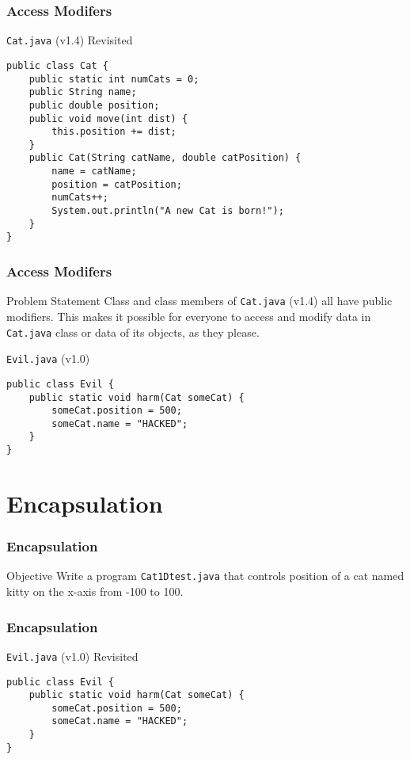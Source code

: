 \documentclass[10pt, compress]{beamer}
\begin{document}
\begin{frame}[fragile]
	\frametitle{Access Modifers}
	\begin{block}{\texttt{Cat.java} (v1.4) Revisited}
		\begin{verbatim}
public class Cat {
	public static int numCats = 0;
	public String name;
	public double position;
	public void move(int dist) {
		this.position += dist;
	}
	public Cat(String catName, double catPosition) {
		name = catName;
		position = catPosition;
		numCats++;
		System.out.println("A new Cat is born!");
	}
}
		\end{verbatim}
	\end{block}
\end{frame}

\begin{frame}[fragile]
	\frametitle{Access Modifers}
	\begin{block}{Problem Statement}
		Class and class members of \texttt{Cat.java} (v1.4) all have public modifiers.
		This makes it possible for everyone to access and modify data in \texttt{Cat.java} class or data of its objects, as they please.
	\end{block}
	\begin{block}{\texttt{Evil.java} (v1.0)}
		\begin{verbatim}
public class Evil {
	public static void harm(Cat someCat) {
		someCat.position = 500;
		someCat.name = "HACKED";
	}
}
		\end{verbatim}
	\end{block}
\end{frame}

\section{Encapsulation}

\begin{frame}[fragile]
	\frametitle{Encapsulation}
	\begin{block}{Objective}
		Write a program \texttt{Cat1Dtest.java} that controls position of a cat named kitty on the x-axis from -100 to 100.
	\end{block}
\end{frame}

\begin{frame}[fragile]
	\frametitle{Encapsulation}
	\begin{block}{\texttt{Evil.java} (v1.0) Revisited}
		\begin{verbatim}
public class Evil {
	public static void harm(Cat someCat) {
		someCat.position = 500;
		someCat.name = "HACKED";
	}
}
		\end{verbatim}
	\end{block}
\end{frame}
\end{document}
